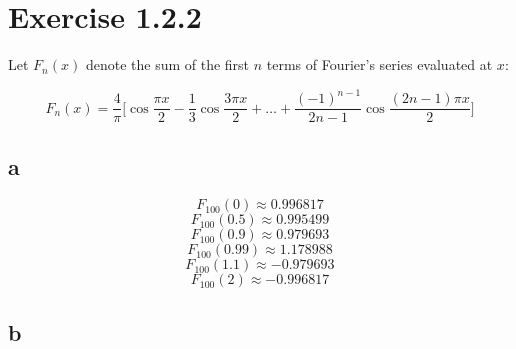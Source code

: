 \documentclass{article}
\begin{document}
\section*{Exercise 1.2.2}

Let \(F_{n}(x)\) denote the sum of the first \(n\) terms of Fourier's series evaluated at \(x\):

\begin{equation*}
    F_{n}(x) = \frac{4}{\pi}\Big[\cos \frac{\pi x}{2} - \frac{1}{3} \cos \frac{3\pi x}{2} + \dots + \frac{(-1)^{n-1}}{2n - 1}\cos \frac{(2n - 1)\pi x}{2}\Big]
\end{equation*}

\subsection*{a}

\begin{equation*}
    F_{100}(0) \approx 0.996817
\end{equation*}
\begin{equation*}
    F_{100}(0.5) \approx 0.995499
\end{equation*}
\begin{equation*}
    F_{100}(0.9) \approx 0.979693
\end{equation*}
\begin{equation*}
    F_{100}(0.99) \approx 1.178988
\end{equation*}
\begin{equation*}
    F_{100}(1.1) \approx -0.979693
\end{equation*}
\begin{equation*}
    F_{100}(2) \approx -0.996817
\end{equation*}

\subsection*{b}
\end{document}
